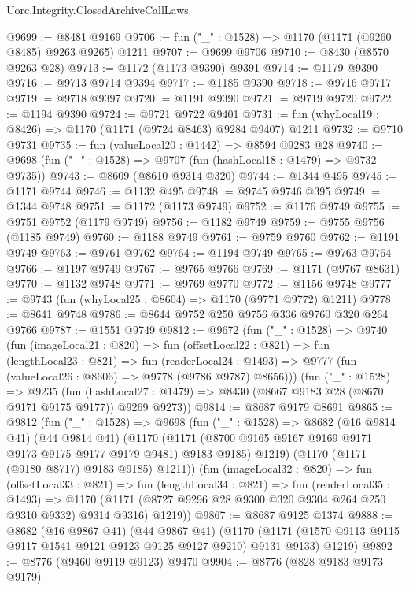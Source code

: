 \begin{lexlean}{Uorc.Integrity.ClosedArchiveCallLaws}
\begin{coremodule}
@9699 := @8481 @9169
@9706 := fun ("_" : @1528) => @1170 (@1171 (@9260 @8485) @9263 @9265) @1211
@9707 := @9699 @9706
@9710 := @8430 (@8570 @9263 @28)
@9713 := @1172 (@1173 @9390) @9391
@9714 := @1179 @9390
@9716 := @9713 @9714 @9394
@9717 := @1185 @9390
@9718 := @9716 @9717
@9719 := @9718 @9397
@9720 := @1191 @9390
@9721 := @9719 @9720
@9722 := @1194 @9390
@9724 := @9721 @9722 @9401
@9731 := fun (whyLocal19 : @8426) => @1170 (@1171 (@9724 @8463) @9284 @9407) @1211
@9732 := @9710 @9731
@9735 := fun (valueLocal20 : @1442) => @8594 @9283 @28
@9740 := @9698 (fun ("_" : @1528) => @9707 (fun (hashLocal18 : @1479) => @9732 @9735))
@9743 := @8609 (@8610 @9314 @320)
@9744 := @1344 @495
@9745 := @1171 @9744
@9746 := @1132 @495
@9748 := @9745 @9746 @395
@9749 := @1344 @9748
@9751 := @1172 (@1173 @9749)
@9752 := @1176 @9749
@9755 := @9751 @9752 (@1179 @9749)
@9756 := @1182 @9749
@9759 := @9755 @9756 (@1185 @9749)
@9760 := @1188 @9749
@9761 := @9759 @9760
@9762 := @1191 @9749
@9763 := @9761 @9762
@9764 := @1194 @9749
@9765 := @9763 @9764
@9766 := @1197 @9749
@9767 := @9765 @9766
@9769 := @1171 (@9767 @8631)
@9770 := @1132 @9748
@9771 := @9769 @9770
@9772 := @1156 @9748
@9777 := @9743 (fun (whyLocal25 : @8604) => @1170 (@9771 @9772) @1211)
@9778 := @8641 @9748
@9786 := @8644 @9752 @250 @9756 @336 @9760 @320 @264 @9766
@9787 := @1551 @9749
@9812 := @9672
    (fun ("_" : @1528) =>
    @9740
      (fun (imageLocal21 : @820) =>
      fun (offsetLocal22 : @821) =>
      fun (lengthLocal23 : @821) =>
      fun (readerLocal24 : @1493) =>
      @9777 (fun (valueLocal26 : @8606) => @9778 (@9786 @9787) @8656)))
    (fun ("_" : @1528) =>
    @9235
      (fun (hashLocal27 : @1479) => @8430 (@8667 @9183 @28 (@8670 @9171 @9175 @9177)) @9269 @9273))
@9814 := @8687 @9179 @8691
@9865 := @9812
    (fun ("_" : @1528) =>
    @9698
      (fun ("_" : @1528) =>
      @8682
        (@16 @9814 @41)
        (@44 @9814 @41)
        (@1170
          (@1171 (@8700 @9165 @9167 @9169 @9171 @9173 @9175 @9177 @9179 @9481) @9183 @9185)
          @1219)
        (@1170 (@1171 (@9180 @8717) @9183 @9185) @1211))
      (fun (imageLocal32 : @820) =>
      fun (offsetLocal33 : @821) =>
      fun (lengthLocal34 : @821) =>
      fun (readerLocal35 : @1493) =>
      @1170 (@1171 (@8727 @9296 @28 @9300 @320 @9304 @264 @250 @9310 @9332) @9314 @9316) @1219))
@9867 := @8687 @9125 @1374
@9888 := @8682
    (@16 @9867 @41)
    (@44 @9867 @41)
    (@1170 (@1171 (@1570 @9113 @9115 @9117 @1541 @9121 @9123 @9125 @9127 @9210) @9131 @9133) @1219)
@9892 := @8776 (@9460 @9119 @9123) @9470
@9904 := @8776
    (@828 @9183 @9173 @9179)

\end{coremodule}
\end{lexlean}
